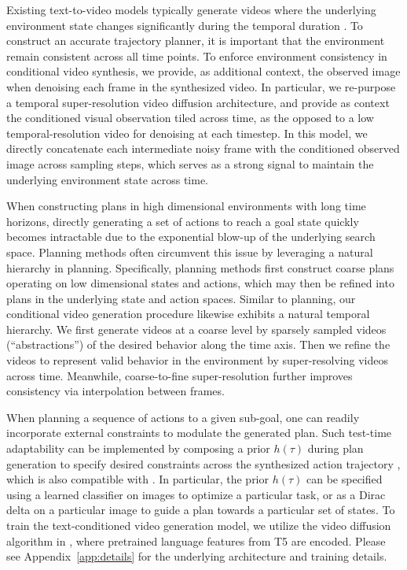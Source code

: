 Existing text-to-video models typically generate videos where the underlying environment state changes significantly during the temporal duration \citep{ho2022imagen}. To construct an accurate trajectory planner, it is important that the environment remain consistent across all time points. To enforce environment consistency in conditional video synthesis, we provide, as additional context, the observed image when denoising each frame in the synthesized video. 
In particular, we re-purpose a temporal super-resolution video diffusion architecture, and provide as context the conditioned visual observation tiled across time, as the opposed to a low temporal-resolution video for denoising at each timestep. In this model, we directly concatenate each intermediate noisy frame with the conditioned observed image across sampling steps, which serves as a strong signal to maintain the underlying environment state across time.



 When constructing plans in high dimensional environments with long time horizons, directly generating a set of actions to reach a goal state quickly becomes intractable due to the exponential blow-up of the underlying search space. Planning methods often circumvent this issue by leveraging a natural hierarchy in planning. Specifically, planning methods first construct coarse plans operating on low dimensional states and actions, which may then be refined into plans in the underlying state and action spaces.
Similar to planning, our conditional video generation procedure likewise exhibits a natural temporal hierarchy. We first generate videos at a coarse level by sparsely sampled videos (``abstractions'') of the desired behavior along the time axis. Then we refine the videos to represent valid behavior in the environment by super-resolving videos across time. Meanwhile, coarse-to-fine super-resolution further improves consistency via interpolation between frames. 

When planning a sequence of actions to a given sub-goal, one can readily incorporate external constraints to modulate the generated plan. Such test-time adaptability can be implemented by composing a prior $h(\tau)$ during plan generation to specify desired constraints across the synthesized action trajectory \citep{janner2022planning},
which is also compatible with \model. 
In particular, the prior $h(\tau)$ can be specified using a learned classifier on images to optimize a particular task, or as a Dirac delta on a particular image to guide a plan towards a particular set of states.
To train the text-conditioned video generation model, we utilize the video diffusion algorithm in \citep{ho2022imagen}, where pretrained language features from T5 \citep{raffel2020exploring} are encoded. Please see Appendix~\ref{app:details} for the underlying architecture and training details.

